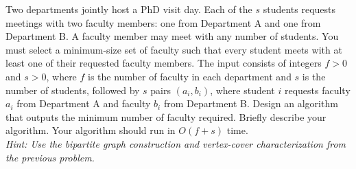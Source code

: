 \documentclass{cs0500}
\begin{document}
\newpage
\begin{problem}
Two departments jointly host a PhD visit day. Each of the $s$ students requests meetings with two faculty members: one from Department A and one from Department B. A faculty member may meet with any number of students. You must select a minimum-size set of faculty such that every student meets with at least one of their requested faculty members. The input consists of integers $f>0$ and $s>0$, where $f$ is the number of faculty in each department and $s$ is the number of students, followed by $s$ pairs $(a_i,b_i)$, where student $i$ requests faculty $a_i$ from Department A and faculty $b_i$ from Department B. Design an algorithm that outputs the minimum number of faculty required. Briefly describe your algorithm. Your algorithm should run in $O(f + s)$ time. 
\\ \emph{Hint: Use the bipartite graph construction and vertex-cover characterization from the previous problem.}

\end{problem}
\begin{solution}
    
\end{solution}
\newpage 
\end{document}
